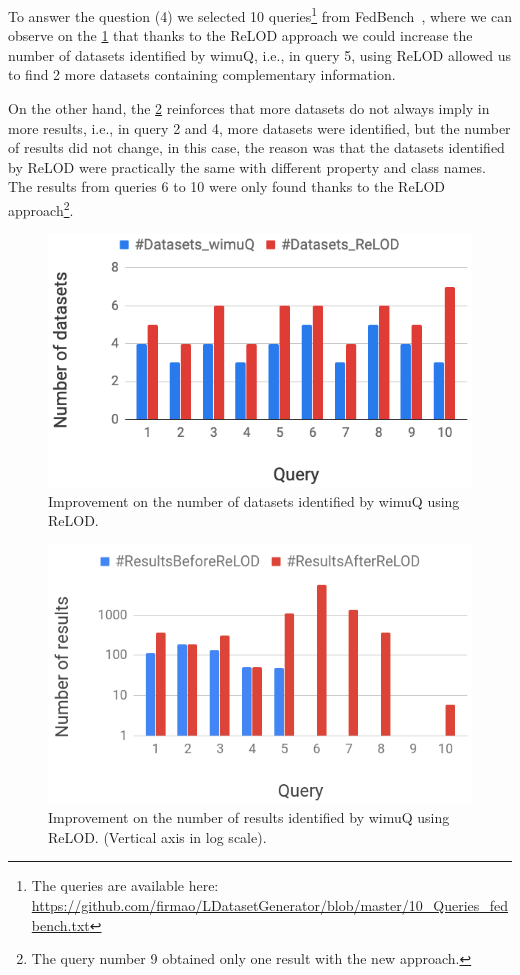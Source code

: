 \documentclass[sw]{iosart2x}
\begin{document}
To answer the question (4) we selected 10 queries\footnote{The queries are available here: \url{https://github.com/firmao/LDatasetGenerator/blob/master/10_Queries_fedbench.txt}} from FedBench~\cite{fedbench2011}, where we can observe on the \cref{fig:wimuQRelodDatasets} that thanks to the ReLOD approach we could increase the number of datasets identified by wimuQ, i.e., in query 5, using ReLOD allowed us to find 2 more datasets containing complementary information. 

On the other hand, the \cref{fig:wimuQRelodResults} reinforces that more datasets do not always imply in more results, i.e., in query 2 and 4, more datasets were identified, but the number of results did not change, in this case, the reason was that the datasets identified by ReLOD were practically the same with different property and class names. The results from queries 6 to 10 were only found thanks to the ReLOD approach\footnote{The query number 9 obtained only one result with the new approach.}.

\begin{figure}[htb] 
	\centering
	\includegraphics[width=\linewidth]{img/wimuQRelodDatasets.png}
	\caption{Improvement on the number of datasets identified by wimuQ using ReLOD.}
	\label{fig:wimuQRelodDatasets}
\end{figure}

\begin{figure}[htb] 
	\centering
	\includegraphics[width=\linewidth]{img/wimuq_relod_results.png}
	\caption{Improvement on the number of results identified by wimuQ using ReLOD. (Vertical axis in log scale).}
	\label{fig:wimuQRelodResults}
\end{figure}
\end{document}
